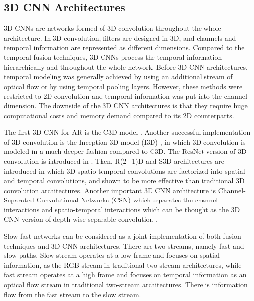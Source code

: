 \documentclass[runningheads]{llncs}
\begin{document}
\subsection{3D CNN Architectures}
\label{sec:intro_3D}
3D CNNs are networks formed of 3D convolution throughout the whole architecture. In 3D convolution, filters are designed in 3D, and channels and temporal information are represented as different dimensions. Compared to the temporal fusion techniques, 3D CNNs process the temporal information hierarchically and throughout the whole network. Before 3D CNN architectures, temporal modeling was generally achieved by using an additional stream of optical flow or by using temporal pooling layers. However, these methods were restricted to 2D convolution and temporal information was put into the channel dimension. The downside of the 3D CNN architectures is that they require huge computational costs and memory demand compared to its 2D counterparts. 

The first 3D CNN for AR is the C3D model \cite{Tran2015}. Another successful implementation of 3D convolution is the Inception 3D model (I3D) \cite{Carreira2017}, in which 3D convolution is modeled in a much deeper fashion compared to C3D. The ResNet version of 3D convolution is introduced in \cite{Hara2018}. Then, R(2+1)D \cite{Tran2018a} and S3D \cite{Xie2018} architectures are introduced in which 3D spatio-temporal convolutions are factorized into spatial and temporal convolutions, and shown to be more effective than traditional 3D convolution architectures. Another important 3D CNN architecture is Channel-Separated Convolutional Networks (CSN) \cite{Tran2019VideoNetworks} which separates the channel interactions and spatio-temporal interactions which can be thought as the 3D CNN version of depth-wise separable convolution \cite{Howard2017}. 

Slow-fast networks \cite{Feichtenhofer2019SlowfastRecognition} can be considered as a joint implementation of both fusion techniques and 3D CNN architectures. There are two streams, namely fast and slow paths. Slow stream operates at a low frame and focuses on spatial information, as the RGB stream in traditional two-stream architectures, while fast stream operates at a high frame and focuses on temporal information as an optical flow stream in traditional two-stream architectures. There is information flow from the fast stream to the slow stream. 
\end{document}
